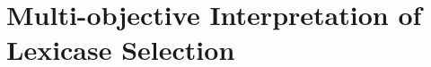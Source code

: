 \documentclass[twoside]{article}
\begin{document}
 


\section{Multi-objective Interpretation of Lexicase Selection}\label{s:mo}
\end{document}
